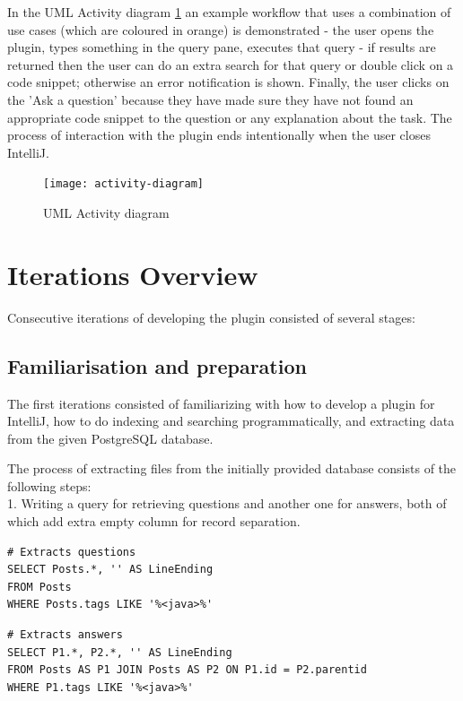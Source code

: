 \documentclass{l4proj}
\begin{document}
In the UML Activity diagram \ref{fig:activity-diagram} an example workflow that uses a combination of use cases (which are coloured in orange) is demonstrated - the user opens the plugin, types something in the query pane, executes that query - if results are returned then the user can do an extra search for that query or double click on a code snippet; otherwise an error notification is shown. Finally, the user clicks on the 'Ask a question' because they have made sure they have not found an appropriate code snippet to the question or any explanation about the task. The process of interaction with the plugin ends intentionally when the user closes IntelliJ.

\begin{figure}[H]
\texttt{[image: activity-diagram]}
\centering
\caption{UML Activity diagram}\label{activity-diagram}
\label{fig:activity-diagram}
\end{figure}

\section{Iterations Overview}
Consecutive iterations of developing the plugin consisted of several stages:

\subsection{Familiarisation and preparation}
The first iterations consisted of familiarizing with how to develop a plugin for IntelliJ, how to do indexing and searching programmatically, and extracting data from the given PostgreSQL database.

The process of extracting files from the initially provided database consists of the following steps:\\
1. Writing a query for retrieving questions and another one for answers, both of which add extra empty column for record separation.\\

\begin{lstlisting}
# Extracts questions
SELECT Posts.*, '' AS LineEnding
FROM Posts
WHERE Posts.tags LIKE '%<java>%'
\end{lstlisting}

\begin{lstlisting}
# Extracts answers
SELECT P1.*, P2.*, '' AS LineEnding
FROM Posts AS P1 JOIN Posts AS P2 ON P1.id = P2.parentid
WHERE P1.tags LIKE '%<java>%'
\end{lstlisting}
\end{document}
